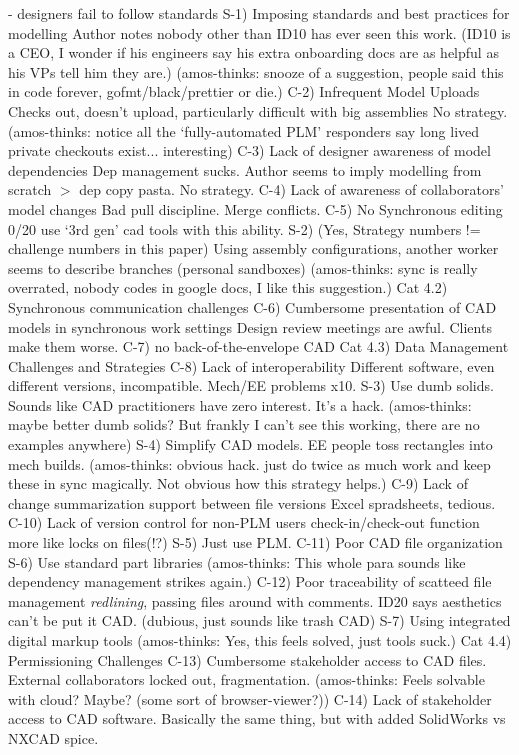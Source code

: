 \documentclass[journal,12pt,onecolumn,]{IEEEtran}
\begin{document}
 - designers fail to follow standards
S-1) Imposing standards and best practices for modelling
Author notes nobody other than ID10 has ever seen this work. 
(ID10 is a CEO, I wonder if his engineers say his extra onboarding docs are as helpful as his VPs tell him they are.)
(amos-thinks: snooze of a suggestion, people said this in code forever, gofmt/black/prettier or die.)
C-2) Infrequent Model Uploads
Checks out, doesn't upload, particularly difficult with big assemblies
No strategy.
(amos-thinks: notice all the `fully-automated PLM' responders say long lived private checkouts exist... interesting)
C-3) Lack of designer awareness of model dependencies
Dep management sucks. Author seems to imply modelling from scratch $>$ dep copy pasta. 
No strategy.
C-4) Lack of awareness of collaborators' model changes
Bad pull discipline. Merge conflicts.
C-5) No Synchronous editing 
0/20 use `3rd gen' cad tools with this ability.
S-2) (Yes, Strategy numbers != challenge numbers in this paper) Using assembly configurations, another worker seems to describe branches (personal sandboxes)
(amos-thinks: sync is really overrated, nobody codes in google docs, I like this suggestion.)
Cat 4.2) Synchronous communication challenges
C-6) Cumbersome presentation of CAD models in synchronous work settings
Design review meetings are awful. Clients make them worse.
C-7) no back-of-the-envelope CAD
Cat 4.3) Data Management Challenges and Strategies
C-8) Lack of interoperability
Different software, even different versions, incompatible. Mech/EE problems x10.
S-3) Use dumb solids. Sounds like CAD practitioners have zero interest. It's a hack.
(amos-thinks: maybe better dumb solids? But frankly I can't see this working, there are no examples anywhere)
S-4) Simplify CAD models. EE people toss rectangles into mech builds.
(amos-thinks: obvious hack. just do twice as much work and keep these in sync magically. Not obvious how this strategy helps.)
C-9) Lack of change summarization support between file versions
Excel spradsheets, tedious. 
C-10) Lack of version control for non-PLM users
check-in/check-out function more like locks on files(!?)
S-5) Just use PLM.
C-11) Poor CAD file organization
S-6) Use standard part libraries
(amos-thinks: This whole para sounds like dependency management strikes again.)
C-12) Poor traceability of scatteed file management 
\textit{redlining}, passing files around with comments. ID20 says aesthetics can't be put it CAD. (dubious, just sounds like trash CAD)
S-7) Using integrated digital markup tools 
(amos-thinks: Yes, this feels solved, just tools suck.)
Cat 4.4) Permissioning Challenges 
C-13) Cumbersome stakeholder access to CAD files. 
External collaborators locked out, fragmentation. 
(amos-thinks: Feels solvable with cloud? Maybe? (some sort of browser-viewer?))
C-14) Lack of stakeholder access to CAD software.
Basically the same thing, but with added SolidWorks vs NXCAD spice. 











\end{document}
